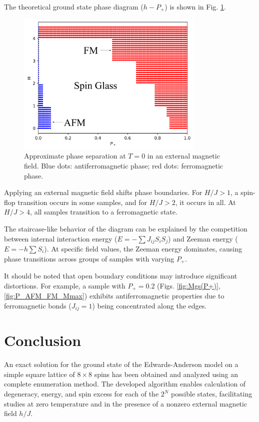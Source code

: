 \documentclass[utf8, babel, sor, jor, amsmath, amssymb, reprint]{elsarticle} %
\begin{document}
The theoretical ground state phase diagram ($h-P_+$) is shown in Fig. \ref{fig:P+_afm_fm(H)}.

\begin{figure}[H]
	\centering
	\includegraphics[width=0.8\textwidth]{images/P+_afm_fm(H)_filled.png}
	\caption{Approximate phase separation at $T = 0$ in an external magnetic field. Blue dots: antiferromagnetic phase; red dots: ferromagnetic phase.}
	\label{fig:P+_afm_fm(H)}
\end{figure}

Applying an external magnetic field shifts phase boundaries. For $H/J > 1$, a spin-flop transition occurs in some samples, and for $H/J > 2$, it occurs in all. At $H/J > 4$, all samples transition to a ferromagnetic state.

The staircase-like behavior of the diagram can be explained by the competition between internal interaction energy ($E = -\sum J_{ij} S_i S_j$) and Zeeman energy ($E = - h \sum S_i$). At specific field values, the Zeeman energy dominates, causing phase transitions across groups of samples with varying $P_+$.

It should be noted that open boundary conditions may introduce significant distortions. For example, a sample with $P_+ = 0.2$ (Figs. \ref{fig:Mgs(P+)}, \ref{fig:P_AFM_FM_Mmax}) exhibits antiferromagnetic properties due to ferromagnetic bonds ($J_{ij} = 1$) being concentrated along the edges.

\section{Conclusion}

An exact solution for the ground state of the Edwards-Anderson model on a simple square lattice of $8 \times 8$ spins has been obtained and analyzed using an complete enumeration method. The developed algorithm enables calculation of degeneracy, energy, and spin excess for each of the $2^N$ possible states, facilitating studies at zero temperature and in the presence of a nonzero external magnetic field $h/J$.
\end{document}
